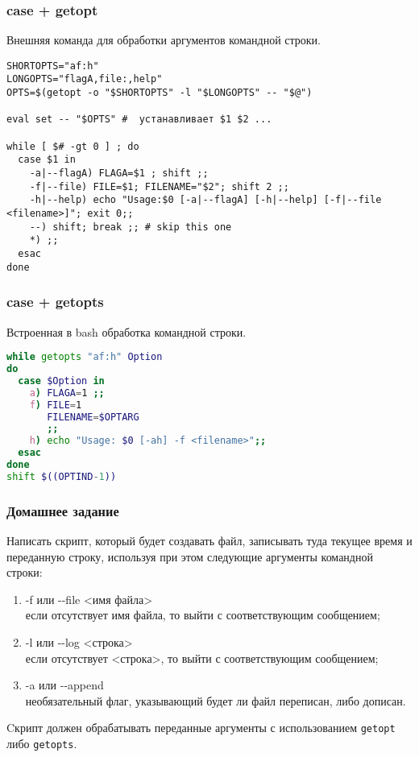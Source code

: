 \begin{frame}[fragile]
\frametitle{case + getopt}
	Внешняя команда для обработки аргументов командной строки.
	\small
	\begin{lstlisting}
SHORTOPTS="af:h"
LONGOPTS="flagA,file:,help"
OPTS=$(getopt -o "$SHORTOPTS" -l "$LONGOPTS" -- "$@")

eval set -- "$OPTS" #  устанавливает $1 $2 ...

while [ $# -gt 0 ] ; do
  case $1 in
    -a|--flagA) FLAGA=$1 ; shift ;;
    -f|--file) FILE=$1; FILENAME="$2"; shift 2 ;;
    -h|--help) echo "Usage:$0 [-a|--flagA] [-h|--help] [-f|--file <filename>]"; exit 0;;
    --) shift; break ;; # skip this one
    *) ;;
  esac
done
	\end{lstlisting}
\end{frame}


\begin{frame}[fragile]
	\frametitle{case + getopts}
	
	Встроенная в bash обработка командной строки.

\begin{lstlisting}[language=sh,frame=single]
while getopts "af:h" Option
do
  case $Option in 
    a) FLAGA=1 ;;
    f) FILE=1
       FILENAME=$OPTARG
       ;;
    h) echo "Usage: $0 [-ah] -f <filename>";;
  esac  
done
shift $((OPTIND-1))
\end{lstlisting}
\end{frame}


\begin{frame}
\frametitle{Домашнее задание}

	Написать скрипт, который будет создавать файл, 
	записывать туда текущее время и переданную строку,
	используя при этом следующие аргументы командной строки: 

	\begin{enumerate}
		\item -f или -{}-file <имя файла>\\
			если отсутствует имя файла, то выйти с соответствующим сообщением;
		\item -l или -{}-log <строка>\\
			если отсутствует <строка>, то выйти с соответствующим сообщением;
		\item -a или -{}-append \\
			необязательный флаг, указывающий будет ли файл переписан, либо дописан.
	\end{enumerate}

	Cкрипт должен обрабатывать переданные аргументы с использованием {\tt getopt} либо {\tt getopts}.

\end{frame}

